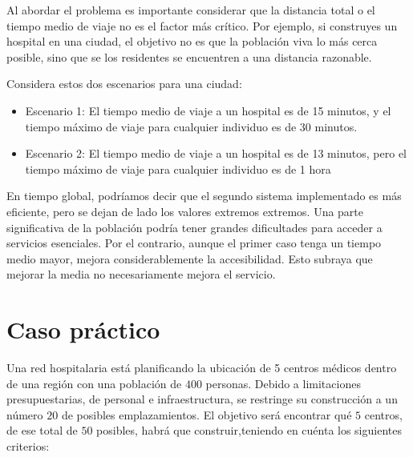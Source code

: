 \documentclass[12pt,a4paper]{book}
\begin{document}
Al abordar el problema es importante considerar que la distancia total o el tiempo medio de viaje no es el factor más crítico. Por ejemplo, si construyes un hospital en una ciudad, el objetivo no es que la población viva lo más cerca posible, sino que se
los residentes se encuentren a una distancia razonable. 

Considera estos dos escenarios para una ciudad:
\begin{itemize}
    \item Escenario 1: El tiempo medio de viaje a un hospital es de 15 minutos, y el tiempo máximo de viaje para cualquier individuo es de 30 minutos.
    \item Escenario 2: El tiempo medio de viaje a un hospital es de 13 minutos, pero el tiempo máximo de viaje para cualquier individuo es de 1 hora
\end{itemize} 
En tiempo global, podríamos decir que el segundo sistema implementado es más eficiente, pero se dejan de lado los valores extremos extremos. Una parte significativa de la población podría tener grandes dificultades para acceder a servicios esenciales. Por el contrario, aunque el primer caso tenga un tiempo medio mayor, mejora considerablemente la accesibilidad. Esto subraya que mejorar la media no necesariamente mejora el servicio.

\section{Caso práctico}

Una red hospitalaria está planificando la ubicación de 5 centros médicos dentro de una región con una población de $400$ personas. Debido a limitaciones presupuestarias, de personal e infraestructura, se restringe su construcción a un número $20$ de posibles emplazamientos. El objetivo será encontrar qué $5$ centros, de ese total de $50$ posibles, habrá que construir,teniendo en cuénta los siguientes criterios:
\end{document}
